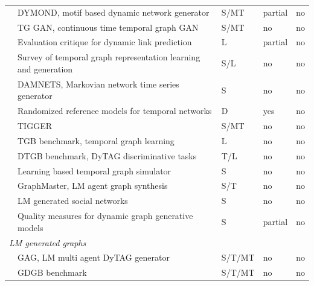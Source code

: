 \begin{table}[t]
{\begin{tabular}{lllll}
\citet{zeno2021dymond}
    & DYMOND, motif based dynamic network generator & S/MT & partial & no \\

\citet{zhang2021tggan}
    & TG GAN, continuous time temporal graph GAN & S/MT & no & no \\

\citet{poursafaei2022better}
    & Evaluation critique for dynamic link prediction & L & partial & no \\

\citet{gupta2022survey}
    & Survey of temporal graph representation learning and generation
    & S/L & no & no \\

\citet{clarkson2022damnets}
    & DAMNETS, Markovian network time series generator & S & no & no \\

\citet{gauvin2022randomized}
    & Randomized reference models for temporal networks & D & yes & no \\

\citet{gupta2022tigger}
    & TIGGER & S/MT & no & no \\

\citet{huang2023tgb}
    & TGB benchmark, temporal graph learning & L & no & no \\

\citet{zhang2024dtgb}
    & DTGB benchmark, DyTAG discriminative tasks & T/L & no & no \\

\citet{xiang2025efficient}
    & Learning based temporal graph simulator & S & no & no \\

\citet{du2025graphmaster}
    & GraphMaster, LM agent graph synthesis & S/T & no & no \\

\citet{chang2025structurally}
    & LM generated social networks & S & no & no \\

\citet{hosseini2025quality}
    & Quality measures for dynamic graph generative models
    & S & partial & no \\


\midrule
\multicolumn{5}{l}{\textit{LM generated graphs}} \\

\citet{ji2025gag}
    & GAG, LM multi agent DyTAG generator & S/T/MT & no & no \\

\citet{peng2025gdgb}
    & GDGB benchmark & S/T/MT & no & no \\


\end{tabular}}
\end{table}
